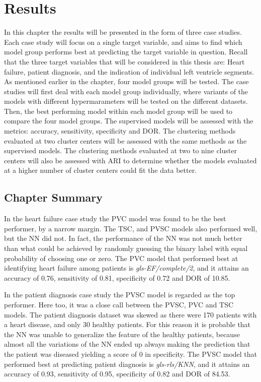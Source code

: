 \chapter{Results}

In this chapter the results will be presented in the form of three case studies. 
Each case study will focus on a single target variable, and aims to find which model group performs best at predicting the target variable in question.
Recall that the three target variables that will be considered in this thesis are: Heart failure, patient diagnosis, and the indication of individual left ventricle segments.
As mentioned earlier in the chapter, four model groups will be tested. 
The case studies will first deal with each model group individually, where variants of the models with different hypermarameters will be tested on the different datasets. 
Then, the best performing model within each model group will be used to compare the four model groups.
The supervised models will be assessed with the metrics: accuracy, sensitivity, specificity and DOR.
The clustering methods evaluated at two cluster centers will be assessed with the same methods as the supervised models. 
The clustering methods evaluated at two to nine cluster centers will also be assessed with ARI to determine 
whether the models evaluated at a higher number of cluster centers could fit the data better.





\newpage
\section*{Chapter Summary}

In the heart failure case study the PVC model was found to be the best performer, by a narrow margin. 
The TSC, and PVSC models also performed well, but the NN did not. In fact, the performance of the NN was not much better 
than what could be achieved by randomly guessing the binary label with equal probability of choosing one or zero. 
The PVC model that performed best at identifying heart failure among patients is \textit{gls-EF/complete/2}, and it attains an 
accuracy of 0.76, sensitivity of 0.81, specificity of 0.72 and DOR of 10.85. \medskip

In the patient diagnosis case study the PVSC model is regarded as the top performer.
Here too, it was a close call between the PVSC, PVC and TSC models.
The patient diagnosis dataset was skewed as there were 170 patients with a heart disease, and only 30 healthy patients. 
For this reason it is probable that the NN was unable to generalize the feature of the healthy patients, 
because almost all the variations of the NN ended up always making the prediction that the patient was diseased yielding a score of 0 in specificity. \smallskip
The PVSC model that performed best at predicting patient diagnosis is \textit{gls-rls/KNN}, and it attains an
accuracy of 0.93, sensitivity of 0.95, specificity of 0.82 and DOR of 84.53. \medskip

